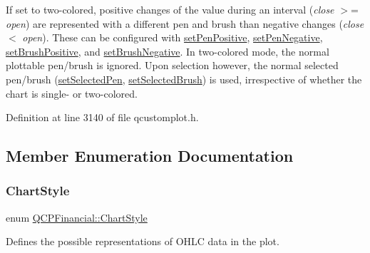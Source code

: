 If set to two-\/colored, positive changes of the value during an interval ({\itshape close} $>$= {\itshape open}) are represented with a different pen and brush than negative changes ({\itshape close} $<$ {\itshape open}). These can be configured with \hyperlink{class_q_c_p_financial_ac58aa3adc7a35aab0088764b840683e5}{set\+Pen\+Positive}, \hyperlink{class_q_c_p_financial_afe5c07e94ccea01a75b3a2476993c346}{set\+Pen\+Negative}, \hyperlink{class_q_c_p_financial_a5ebff2b1764efd07cc44942e67821829}{set\+Brush\+Positive}, and \hyperlink{class_q_c_p_financial_a8bbdd87629f9144b3ef51af660c0961a}{set\+Brush\+Negative}. In two-\/colored mode, the normal plottable pen/brush is ignored. Upon selection however, the normal selected pen/brush (\hyperlink{class_q_c_p_abstract_plottable_a6911603cad23ab0469b108224517516f}{set\+Selected\+Pen}, \hyperlink{class_q_c_p_abstract_plottable_ae8c816874089f7a44001e8618e81a9dc}{set\+Selected\+Brush}) is used, irrespective of whether the chart is single-\/ or two-\/colored. 

Definition at line 3140 of file qcustomplot.\+h.



\subsection{Member Enumeration Documentation}
\mbox{\label{class_q_c_p_financial_a0f800e21ee98d646dfc6f8f89d10ebfb}} 
\subsubsection{\texorpdfstring{Chart\+Style}{ChartStyle}}
{\footnotesize\ttfamily enum \hyperlink{class_q_c_p_financial_a0f800e21ee98d646dfc6f8f89d10ebfb}{Q\+C\+P\+Financial\+::\+Chart\+Style}}

Defines the possible representations of O\+H\+LC data in the plot.

